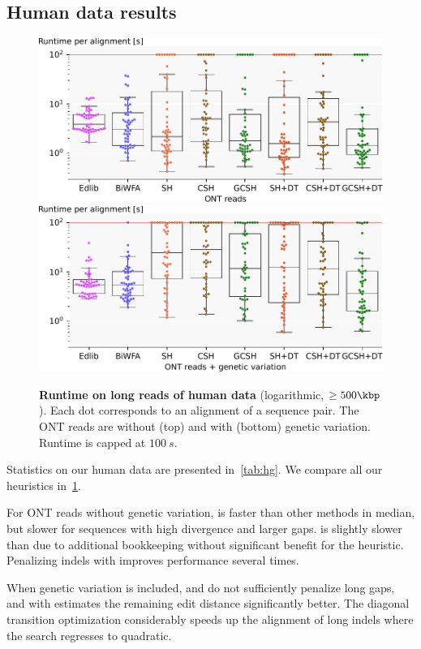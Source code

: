 \subsection{Human data results}\label{app:human}



\begin{figure}[H]
  \centering
  \includegraphics[scale=0.55]{plots/real_full_without_bio_var.pdf}\\
  \includegraphics[scale=0.55]{plots/real_full_with_bio_var.pdf}%
  \caption[Runtime on long reads of human data]{\textbf{Runtime on long reads of
    human data} (logarithmic, $\geq 500\kbp$). Each dot corresponds to an
    alignment of a sequence pair. The ONT reads are without (top) and with
    (bottom) genetic variation. Runtime is capped at $\qty{100}{s}$.}
  \label{fig:human-full}
\end{figure}

Statistics on our human data are presented in~\cref{tab:hg}. We compare all our
heuristics in~\cref{fig:human-full}.

For ONT reads without genetic variation, \SH is faster than other methods in
median, but slower for sequences with high divergence and larger gaps.
\CSH is slightly slower than \SH due to additional bookkeeping without
significant benefit for the heuristic. Penalizing indels with \GCH improves
performance several times.

When genetic variation is included, \SH and \CSH do not sufficiently penalize
long gaps, and \A with \GCH estimates the remaining edit distance significantly
better. The diagonal transition optimization considerably speeds up the
alignment of long indels where the search regresses to quadratic.
